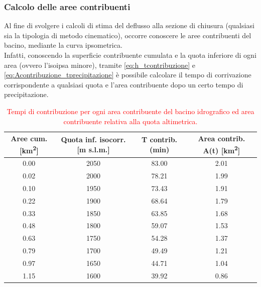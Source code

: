 \subsubsection{Calcolo delle aree contribuenti}
Al fine di svolgere i calcoli di stima del deflusso alla sezione di chiusura (qualsiasi sia la tipologia di metodo cinematico), occorre conoscere le aree contribuenti del bacino, mediante la curva ipsometrica.\\
Infatti, conoscendo la superficie contribuente cumulata e la quota inferiore di ogni area (ovvero l'isoipsa minore), tramite \eqref{eq:h_tcontribuzione} e \eqref{eq:Acontribuzione_tprecipitazione} è possibile calcolare il tempo di corrivazione corrispondente a qualsiasi quota e l'area contribuente dopo un certo tempo di precipitazione.
\begin{table}[H] \centering
\caption{\textcolor{red}{Tempi di contribuzione per ogni area contribuente del bacino idrografico ed area contribuente relativa alla quota altimetrica.}}
    \begin{tabular}{cccc}
\toprule
Aree cum. [\unit{km^2}]& Quota inf. isocorr. [m s.l.m.] &  T contrib. (min) & Area contrib. A(t) [\unit{km^2}] \\
\midrule
    0.00          & 2050                       & 83.00                       & 2.01                   \\
    0.02          & 2000                       & 78.21                       & 1.99                   \\
    0.10          & 1950                       & 73.43                       & 1.91                   \\
    0.22          & 1900                       & 68.64                       & 1.79                   \\
    0.33          & 1850                       & 63.85                       & 1.68                   \\
    0.48          & 1800                       & 59.07                       & 1.53                   \\
    0.63          & 1750                       & 54.28                       & 1.37                   \\
    0.79          & 1700                       & 49.49                       & 1.21                   \\
    0.97          & 1650                       & 44.71                       & 1.04                   \\
    1.15          & 1600                       & 39.92                       & 0.86                   \\

\end{tabular}
\end{table}

